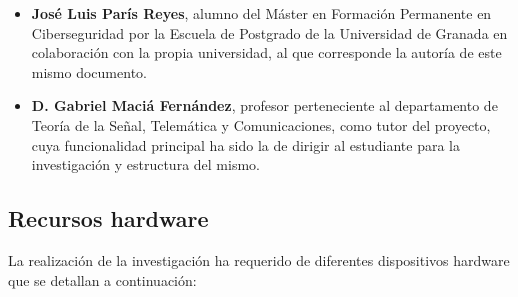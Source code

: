 \begin{itemize}
    \item \textbf{José Luis París Reyes}, alumno del Máster en Formación Permanente en Ciberseguridad por la Escuela de 
      Postgrado de la Universidad de Granada en colaboración con la propia universidad, al que corresponde la autoría
      de este mismo documento.
    \item \textbf{D. Gabriel Maciá Fernández}, profesor perteneciente al departamento de Teoría de la Señal, Telemática
      y Comunicaciones, como tutor del proyecto, cuya funcionalidad principal ha sido la de dirigir al estudiante para la 
      investigación y estructura del mismo.
\end{itemize}

\subsection{Recursos hardware}

La realización de la investigación ha requerido de diferentes dispositivos hardware que se detallan a continuación:

